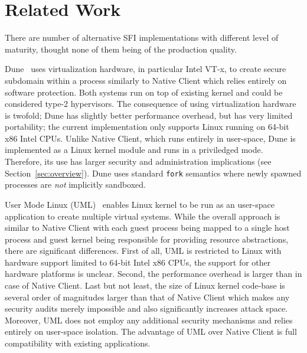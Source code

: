 \section{Related Work}
\label{sec:related}

There are number of alternative SFI implementations with different level
of maturity, thought none of them being of the production quality.


Dune~\cite{belay:osdi12} uses virtualization hardware, in particular
Intel VT-x, to create secure subdomain within a process similarly to
Native Client which relies entirely on software protection. Both
systems run on top of existing kernel and could be considered type-2
hypervisors. The consequence of using virtualization hardware is
twofold; Dune has slightly better performance overhead, but has very
limited portability; the current implementation only supports Linux
running on 64-bit x86 Intel CPUs. Unlike Native Client, which runs
entirely in user-space, Dune is implemented as a Linux kernel module and
runs in a priviledged mode. Therefore, its use has larger security and
administration implications (see Section~\ref{sec:overview}). Dune uses
standard \lstinline`fork` semantics where newly spawned processes are
\emph{not} implicitly sandboxed.

User Mode Linux (UML)~\cite{uml:linux06} enables Linux kernel to be run as
an user-space application to create multiple virtual systems. While the
overall approach is similar to Native Client with each guest process being
mapped to a single host process and guest kernel being responsible for
providing resource abstractions, there are significant differences.
First of all, UML is restricted to Linux with hardware support limited
to 64-bit Intel x86 CPUs, the support for other hardware platforms is
unclear. Second, the performance overhead is larger than in case of
Native Client. Last but not least, the size of Linux kernel code-base is
several order of magnitudes larger than that of Native Client which
makes any security audits merely impossible and also significantly
increases attack space. Moreover, UML does not employ any additional
security mechanisms and relies entirely on user-space isolation. The
advantage of UML over Native Client is full compatibility with existing
applications.

\cite{heiser:hotos11}
\cite{tanenbaum:osdi08}
\cite{engler:sosp95}
\cite{yee:ieee-sp09}
\cite{sehr:usenix-sec10}
\cite{ansel:pldi11}
\cite{donovan:pnacl10}
